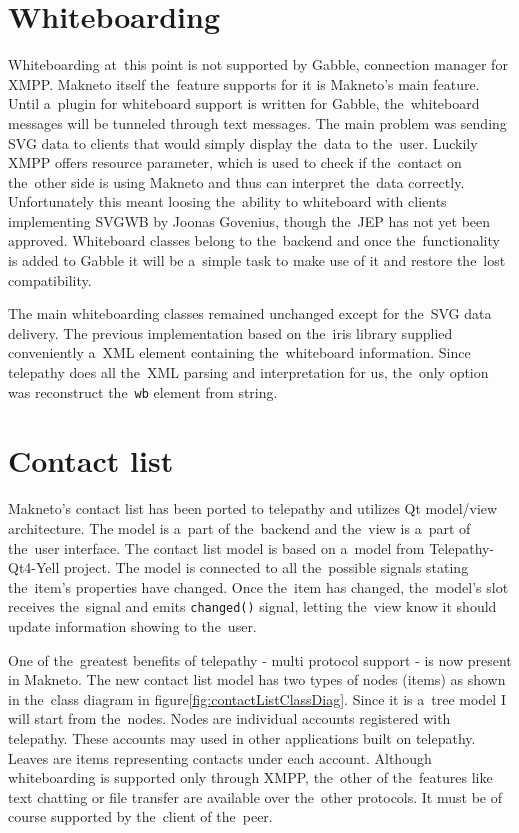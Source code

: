 \section{Whiteboarding}
Whiteboarding at~this point is not supported by Gabble, connection manager for XMPP. Makneto itself the~feature supports for it is Makneto's main feature. Until a~plugin for whiteboard support is written for Gabble, the~whiteboard messages will be tunneled through text messages. The main problem was sending SVG data to clients that would simply display the~data to the~user. Luckily XMPP offers resource parameter, which is used to check if the~contact on the~other side is using Makneto and thus can interpret the~data correctly. Unfortunately this meant loosing the~ability to whiteboard with clients implementing SVGWB by Joonas Govenius, though the~JEP has not yet been approved. Whiteboard classes belong to the~backend and once the~functionality is added to Gabble it will be a~simple task to make use of it and restore the~lost compatibility. 

The main whiteboarding classes remained unchanged except for the~SVG data delivery. The previous implementation based on the~iris library supplied conveniently a~XML element containing the~whiteboard information. Since telepathy does all the~XML parsing and interpretation for us, the~only option was reconstruct the~\verb|wb| element from string.  

\section{Contact list}\label{section:contactList}
Makneto's contact list has been ported to telepathy and utilizes Qt model/view architecture. The model is a~part of the~backend and the~view is a~part of the~user interface. The contact list model is based on a~model from Telepathy-Qt4-Yell project\cite{telepathyQt4Yell}. The model is connected to all the~possible signals stating the~item's properties have changed. Once the~item has changed, the~model's slot receives the~signal and emits \verb|changed()| signal, letting the~view know it should update information showing to the~user.   

One of the~greatest benefits of telepathy - multi protocol support - is now present in Makneto. The new contact list model has two types of nodes (items) as shown in the~class diagram in figure\ref{fig:contactListClassDiag}. Since it is a~tree model I will start from the~nodes. Nodes are individual accounts registered with telepathy. These accounts may used in other applications built on telepathy. Leaves are items representing contacts under each account. Although whiteboarding is supported only through XMPP, the~other of the~features like text chatting or file transfer are available over the~other protocols. It must be of course supported by the~client of the~peer.

